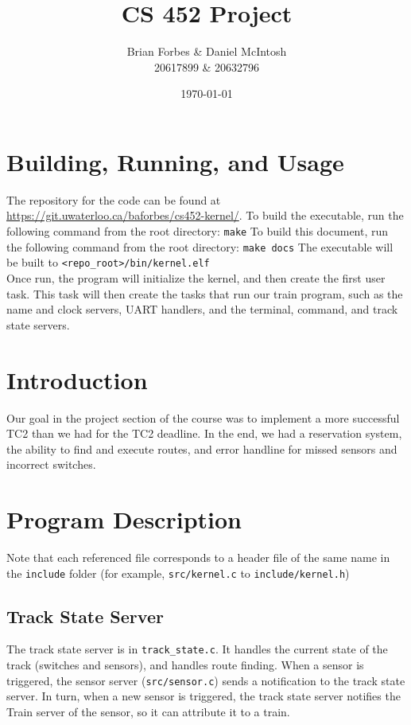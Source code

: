 \documentclass{article}
\begin{document}
\title{CS 452 Project}
\author{Brian Forbes \& Daniel McIntosh \\ 20617899 \& 20632796}
\date{\today}

\maketitle

\section{ Building, Running, and Usage }

The repository for the code can be found at \url{https://git.uwaterloo.ca/baforbes/cs452-kernel/}.
To build the executable, run the following command from the root directory: \verb|make|
To build this document, run the following command from the root directory: \verb|make docs|
The executable will be built to \verb|<repo_root>/bin/kernel.elf|\\

Once run, the program will initialize the kernel, and then create the first user task. This task will then create the tasks that run our train program, such as the name and clock servers, UART handlers, and the terminal, command, and track state servers.

\section{Introduction}
Our goal in the project section of the course was to implement a more successful TC2 than we had for the TC2 deadline.
In the end, we had a reservation system, the ability to find and execute routes, and error handline for missed sensors and incorrect switches.

\section{Program Description}
Note that each referenced file corresponds to a header file of the same name in the \verb|include| folder (for example, \verb|src/kernel.c| to \verb|include/kernel.h|)

\subsection{ Track State Server}
The track state server is in \verb|track_state.c|.
It handles the current state of the track (switches and sensors), and handles route finding. When a sensor is triggered, the sensor server (\verb|src/sensor.c|) sends a notification to the track state server. In turn, when a new sensor is triggered, the track state server notifies the Train server of the sensor, so it can attribute it to a train.
\end{document}
